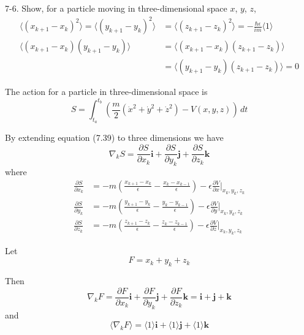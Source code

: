 \documentclass[12pt]{article}
\begin{document}
7-6.
Show, for a particle moving in three-dimensional space $x$, $y$, $z$,
\begin{align*}
\langle(x_{k+1}-x_k)^2\rangle
=\langle(y_{k+1}-y_k)^2\rangle
&=\langle(z_{k+1}-z_k)^2\rangle
=-\frac{\hbar\epsilon}{im}\langle1\rangle
\tag{7.50}
\\
\langle(x_{k+1}-x_k)(y_{k+1}-y_k)\rangle
&=\langle(x_{k+1}-x_k)(z_{k+1}-z_k)\rangle
\\
&=\langle(y_{k+1}-y_k)(z_{k+1}-z_k)\rangle=0
\tag{7.51}
\end{align*}

The action for a particle in three-dimensional space is
\begin{equation*}
S=\int_{t_a}^{t_b}\left(\frac{m}{2}\left(\dot x^2+\dot y^2+\dot z^2\right)-V(x,y,z)\right)\,dt
\end{equation*}

By extending equation (7.39) to three dimensions we have
\begin{equation*}
\nabla_kS
=\frac{\partial S}{\partial x_k}\mathbf i
+\frac{\partial S}{\partial y_k}\mathbf j
+\frac{\partial S}{\partial z_k}\mathbf k
\end{equation*}
where
\begin{align*}
\frac{\partial S}{\partial x_k}
&=-m\left(\frac{x_{k+1}-x_k}{\epsilon}-\frac{x_k-x_{k-1}}{\epsilon}\right)
-\epsilon\frac{\partial V}{\partial x}\bigg|_{x_k,y_k,z_k}
\\
\frac{\partial S}{\partial y_k}
&=-m\left(\frac{y_{k+1}-y_k}{\epsilon}-\frac{y_k-y_{k-1}}{\epsilon}\right)
-\epsilon\frac{\partial V}{\partial y}\bigg|_{x_k,y_k,z_k}
\\
\frac{\partial S}{\partial z_k}
&=-m\left(\frac{z_{k+1}-z_k}{\epsilon}-\frac{z_k-z_{k-1}}{\epsilon}\right)
-\epsilon\frac{\partial V}{\partial z}\bigg|_{x_k,y_k,z_k}
\end{align*}

Let
\begin{equation*}
F=x_k+y_k+z_k
\end{equation*}

Then
\begin{equation*}
\nabla_kF
=\frac{\partial F}{\partial x_k}\mathbf i
+\frac{\partial F}{\partial y_k}\mathbf j
+\frac{\partial F}{\partial z_k}\mathbf k
=\mathbf i+\mathbf j+\mathbf k
\end{equation*}
and
\begin{equation*}
\langle\nabla_kF\rangle
=\langle1\rangle\mathbf i
+\langle1\rangle\mathbf j
+\langle1\rangle\mathbf k
\end{equation*}
\end{document}
